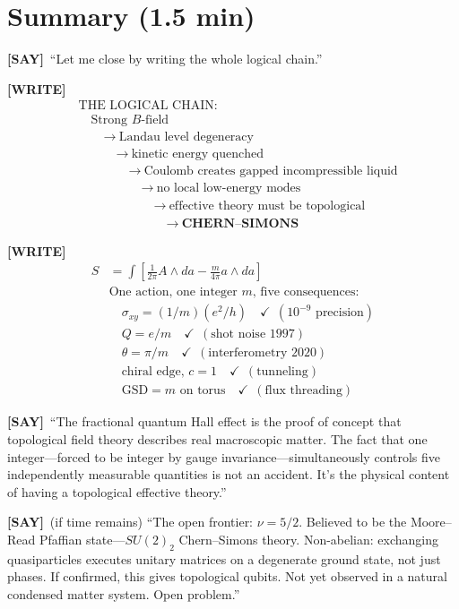 \documentclass[11pt]{article}
\newcommand{\WRITE}{\textcolor{writecol}{\textbf{[WRITE]}}}
\newcommand{\SAY}{\textcolor{saycol}{\textbf{[SAY]}}}
\begin{document}
\section{Summary (1.5 min)}

\SAY\ ``Let me close by writing the whole logical chain.''

\WRITE
\begin{align*}
&\text{THE LOGICAL CHAIN:}\\[4pt]
&\quad\text{Strong }B\text{-field}\\
&\qquad\to\ \text{Landau level degeneracy}\\
&\qquad\quad\to\ \text{kinetic energy quenched}\\
&\qquad\qquad\to\ \text{Coulomb creates gapped incompressible liquid}\\
&\qquad\qquad\quad\to\ \text{no local low-energy modes}\\
&\qquad\qquad\qquad\to\ \text{effective theory must be topological}\\
&\qquad\qquad\qquad\quad\to\ \textbf{CHERN--SIMONS}
\end{align*}

\WRITE
\begin{align*}
S &= \int\!\left[\tfrac{1}{2\pi}A\wedge da - \tfrac{m}{4\pi}a\wedge da\right]\\[8pt]
&\text{One action, one integer }m\text{, five consequences:}\\[4pt]
&\quad\sigma_{xy} = (1/m)(e^2/h) \quad\checkmark\ \ (10^{-9}\text{ precision})\\
&\quad Q = e/m \quad\checkmark\ \ (\text{shot noise 1997})\\
&\quad \theta = \pi/m \quad\checkmark\ \ (\text{interferometry 2020})\\
&\quad \text{chiral edge, }c=1 \quad\checkmark\ \ (\text{tunneling})\\
&\quad \text{GSD} = m\text{ on torus} \quad\checkmark\ \ (\text{flux threading})
\end{align*}

\SAY\ ``The fractional quantum Hall effect is the proof of concept that topological field theory describes real macroscopic matter. The fact that one integer---forced to be integer by gauge invariance---simultaneously controls five independently measurable quantities is not an accident. It's the physical content of having a topological effective theory.''

\SAY\ (if time remains) ``The open frontier: $\nu = 5/2$. Believed to be the Moore--Read Pfaffian state---$SU(2)_2$ Chern--Simons theory. Non-abelian: exchanging quasiparticles executes unitary matrices on a degenerate ground state, not just phases. If confirmed, this gives topological qubits. Not yet observed in a natural condensed matter system. Open problem.''
\end{document}
